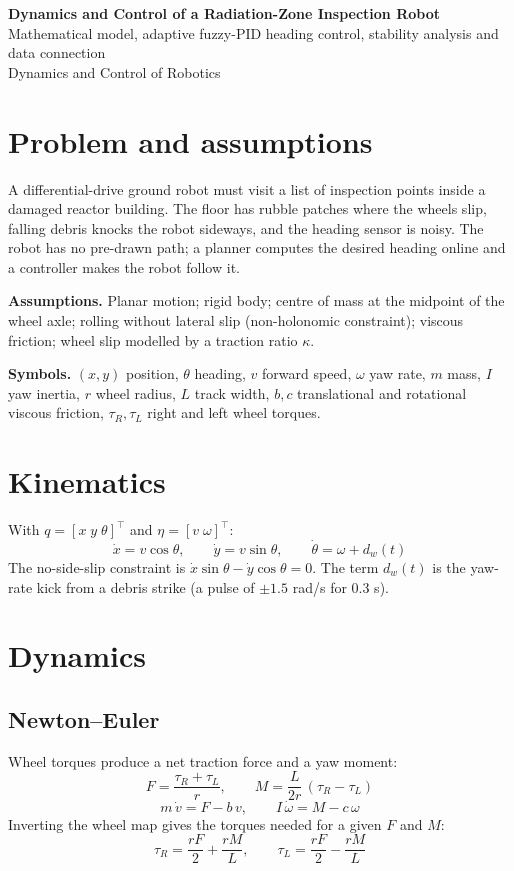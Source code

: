 \documentclass[11pt,a4paper]{article}
\newcommand{\dd}[1]{\dot{#1}}
\begin{document}
{\LARGE\bfseries Dynamics and Control of a Radiation-Zone Inspection Robot}\\[2pt]
{\large Mathematical model, adaptive fuzzy-PID heading control, stability analysis and data connection}\\[2pt]
Dynamics and Control of Robotics

\section{Problem and assumptions}
A differential-drive ground robot must visit a list of inspection points inside a damaged reactor building. The floor has rubble patches where the wheels slip, falling debris knocks the robot sideways, and the heading sensor is noisy. The robot has no pre-drawn path; a planner computes the desired heading online and a controller makes the robot follow it.

\textbf{Assumptions.} Planar motion; rigid body; centre of mass at the midpoint of the wheel axle; rolling without lateral slip (non-holonomic constraint); viscous friction; wheel slip modelled by a traction ratio $\kappa$.

\textbf{Symbols.} $(x,y)$ position, $\theta$ heading, $v$ forward speed, $\omega$ yaw rate, $m$ mass, $I$ yaw inertia, $r$ wheel radius, $L$ track width, $b,c$ translational and rotational viscous friction, $\tau_R,\tau_L$ right and left wheel torques.

\section{Kinematics}
With $q=[x\;y\;\theta]^\top$ and $\eta=[v\;\omega]^\top$:
\begin{equation}
\dd x=v\cos\theta,\qquad \dd y=v\sin\theta,\qquad \dd\theta=\omega+d_w(t)
\label{eq:kin}
\end{equation}
The no-side-slip constraint is $\dd x\sin\theta-\dd y\cos\theta=0$. The term $d_w(t)$ is the yaw-rate kick from a debris strike (a pulse of $\pm1.5$ rad/s for 0.3 s).

\section{Dynamics}
\subsection{Newton--Euler}
Wheel torques produce a net traction force and a yaw moment:
\begin{equation}
F=\frac{\tau_R+\tau_L}{r},\qquad M=\frac{L}{2r}\,(\tau_R-\tau_L)
\end{equation}
\begin{equation}
m\,\dd v=F-b\,v,\qquad I\,\dd\omega=M-c\,\omega
\label{eq:ne}
\end{equation}
Inverting the wheel map gives the torques needed for a given $F$ and $M$:
\begin{equation}
\tau_R=\frac{rF}{2}+\frac{rM}{L},\qquad \tau_L=\frac{rF}{2}-\frac{rM}{L}
\end{equation}
\end{document}
